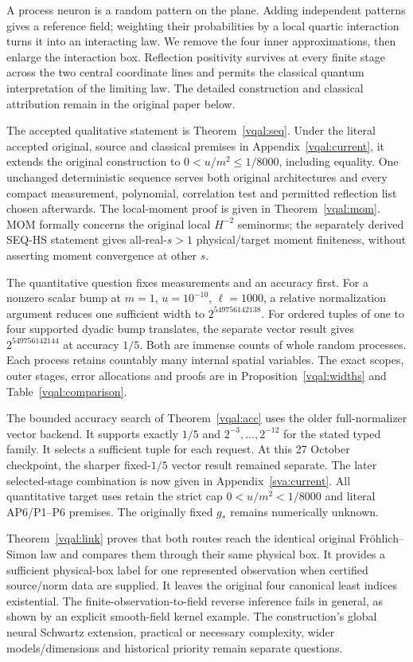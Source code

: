 \documentclass[11pt]{article}
\theoremstyle{plain}
\theoremstyle{definition}
\theoremstyle{remark}
\begin{document}
A process neuron is a random pattern on the plane. Adding independent
patterns gives a reference field; weighting their probabilities by a local
quartic interaction turns it into an interacting law. We remove the four
inner approximations, then enlarge the interaction box. Reflection
positivity survives at every finite stage across the two central coordinate
lines and permits the classical quantum interpretation of the limiting law.
The detailed construction and classical attribution remain in the original
paper below.

The accepted qualitative statement is Theorem~\ref{vqal:seq}. Under the
literal accepted original, source and classical premises in
Appendix~\ref{vqal:current}, it extends the original construction to
$0<u/m^2\le1/8000$, including equality. One unchanged deterministic
sequence serves both original architectures and every compact measurement,
polynomial, correlation test and permitted reflection list chosen afterwards.
The local-moment proof is given in Theorem~\ref{vqal:mom}. MOM formally
concerns the original local $H^{-2}$ seminorms; the separately derived
SEQ-HS statement gives all-real-$s>1$ physical/target moment finiteness,
without asserting moment convergence at other $s$.

The quantitative question fixes measurements and an accuracy first.
For a nonzero scalar bump at $m=1$, $u=10^{-10}$, $\ell=1000$, a relative
normalization argument reduces one sufficient width to $2^{549756142138}$.
For ordered tuples of one to four supported dyadic bump translates, the
separate vector result gives $2^{549756142144}$ at accuracy $1/5$.
Both are immense counts of whole random processes. Each process retains
countably many internal spatial variables. The exact scopes, outer stages,
error allocations and proofs are in
Proposition~\ref{vqal:widths} and Table~\ref{vqal:comparison}.

The bounded accuracy search of Theorem~\ref{vqal:acc} uses the older
full-normalizer vector backend. It supports exactly $1/5$ and
$2^{-3},\ldots,2^{-12}$ for the stated typed family. It selects a
sufficient tuple for each request. At this 27 October checkpoint, the
sharper fixed-$1/5$ vector result remained separate. The later selected-stage
combination is now given in Appendix~\ref{sva:current}. All quantitative target
uses retain the strict cap $0<u/m^2<1/8000$ and literal AP6/P1--P6
premises. The originally fixed $g_*$ remains numerically unknown.

Theorem~\ref{vqal:link} proves that both routes reach the identical
original Fr\"ohlich--Simon law and compares them through their same
physical box. It provides a sufficient physical-box label for one
represented observation when certified source/norm data are supplied.
It leaves the original four canonical least indices existential. The
finite-observation-to-field reverse inference fails in general, as shown
by an explicit smooth-field kernel example. The construction's global
neural Schwartz extension, practical or necessary complexity, wider
models/dimensions and historical priority remain separate questions.
\end{document}
